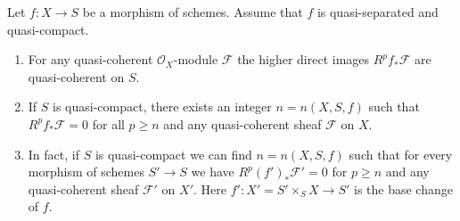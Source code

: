 \begin{lemma}
\label{lemma-quasi-coherence-higher-direct-images}
Let $f : X \to S$ be a morphism of schemes.
Assume that $f$ is quasi-separated and quasi-compact.
\begin{enumerate}
\item For any quasi-coherent $\mathcal{O}_X$-module $\mathcal{F}$ the
higher direct images $R^pf_*\mathcal{F}$ are quasi-coherent on $S$.
\item If $S$ is quasi-compact, there exists an integer $n = n(X, S, f)$
such that $R^pf_*\mathcal{F} = 0$ for all $p \geq n$ and any
quasi-coherent sheaf $\mathcal{F}$ on $X$.
\item In fact, if $S$ is quasi-compact we can find $n = n(X, S, f)$
such that for every
morphism of schemes $S' \to S$ we have $R^p(f')_*\mathcal{F}' = 0$
for $p \geq n$ and any quasi-coherent sheaf $\mathcal{F}'$
on $X'$. Here $f' : X' = S' \times_S X \to S'$ is the base change of $f$.
\end{enumerate}
\end{lemma}

